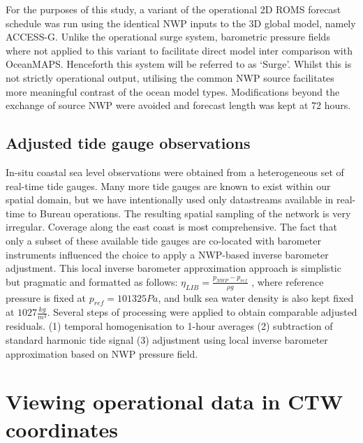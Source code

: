 For the purposes of this study, a variant of the operational 2D ROMS forecast schedule was run using the identical NWP inputs to the 3D global model, namely ACCESS-G.   
Unlike the operational surge system, barometric pressure fields where not applied to this variant to facilitate direct model inter comparison with OceanMAPS.
Henceforth this system will be referred to as `Surge'.
Whilst this is not strictly operational output, utilising the common NWP source facilitates more meaningful contrast of the ocean model types. 
Modifications beyond the exchange of source NWP were avoided and forecast length was kept at 72 hours.


\subsection{Adjusted tide gauge observations}
In-situ coastal sea level observations were obtained from a heterogeneous set of real-time tide gauges. 
Many more tide gauges are known to exist within our spatial domain, but we have intentionally used only datastreams available in real-time to Bureau operations.
The resulting spatial sampling of the network is very irregular. 
Coverage along the east coast is most comprehensive.   
The fact that only a subset of these available tide gauges are co-located with barometer instruments influenced the choice to apply a NWP-based inverse barometer adjustment.
This local inverse barometer approximation approach is simplistic \citep{Mathers:2004bk} but pragmatic and formatted as follows:
$ \eta_{LIB} = \frac{ p_{NWP} - p_{ref} }{ \rho g } $
, where reference pressure is fixed at $p_{ref}=101325Pa$, and bulk sea water density is also kept fixed at $1027\frac{kg}{m^3}$. 
Several steps of processing were applied to obtain comparable adjusted residuals.
(1) temporal homogenisation to 1-hour averages (2) subtraction of standard harmonic tide signal (3) adjustment using local inverse barometer approximation based on NWP pressure field.

\section{Viewing operational data in CTW coordinates}

